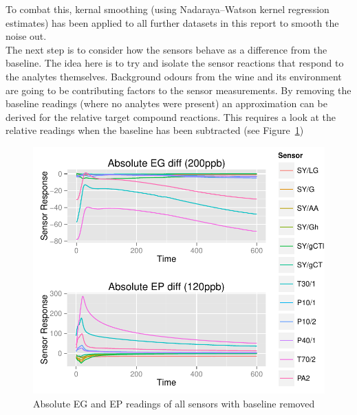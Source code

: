 \documentclass[twocolumn]{article}
\begin{document}
To combat this, kernal smoothing (using Nadaraya–Watson kernel regression estimates\cite{nwkernal}) has been applied to all further 
datasets in this report to smooth the noise out.\\
The next step is to consider how the sensors behave as a difference from the baseline. The idea here is to try
and isolate the sensor reactions that respond to the analytes themselves. Background odours from the wine and its
environment are going to be contributing factors to the sensor measurements. By removing the baseline readings (where no analytes
were present) an approximation can be derived for the relative target compound reactions. This requires a look
at the relative readings when the baseline has been subtracted (see Figure~\ref{fig:absoluteAnalyteDiffReadings})
\begin{figure}[h!]
	\includegraphics[trim = 0mm 0mm 0mm 0mm, clip, scale=0.55]{absoluteEGEPDiffreadings.pdf}
	\caption{Absolute EG and EP readings of all sensors with baseline removed}
	\label{fig:absoluteAnalyteDiffReadings}
\end{figure}
\end{document}
